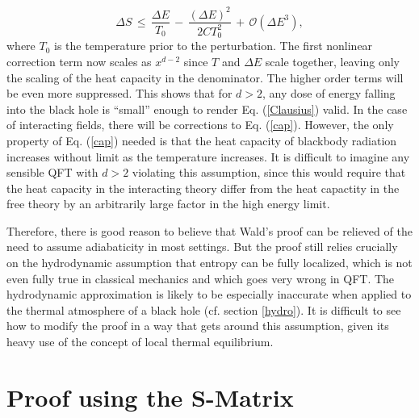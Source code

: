 \documentclass{article}
\begin{document}
{\begin{equation}
\Delta S \,\le\, 
\frac{\Delta E}{T_{0}} \,-\, \frac{(\Delta E)^2}{2CT_{0}^2} \,+\, \mathcal{O}(\Delta E^3),
\end{equation}
where $T_{0}$ is the temperature prior to the perturbation.  The first nonlinear correction term now scales as $x^{d-2}$ since $T$ and $\Delta E$ scale together, leaving only the scaling of the heat capacity in the denominator.  The higher order terms will be even more suppressed.  This shows that for $d > 2$, any dose of energy falling into the black hole is ``small'' enough to render Eq. (\ref{Clausius}) valid.  In the case of interacting fields, there will be corrections to Eq. (\ref{cap}).  However, the only property of  Eq. (\ref{cap}) needed is that the heat capacity of blackbody radiation increases without limit as the temperature increases.  It is difficult to imagine any sensible QFT with $d > 2$ violating this assumption, since this would require that the heat capacity in the interacting theory differ from the heat capactity in the free theory by an arbitrarily large factor in the high energy limit.}

Therefore, there is good reason to believe that Wald's proof can be relieved of the need to assume adiabaticity in most settings.  But the proof still relies crucially on the hydrodynamic assumption that entropy can be fully localized, which is not even fully true in classical mechanics and which goes very wrong in QFT.  The hydrodynamic approximation is likely to be especially inaccurate when applied to the thermal atmosphere of a black hole (cf. section \ref{hydro}).  It is difficult to see how to modify the proof in a way that gets around this assumption, given its heavy use of the concept of local thermal equilibrium.

\section{Proof using the S-Matrix}\label{Smat}
\end{document}
